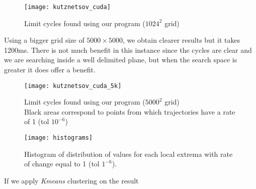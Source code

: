 \begin{figure}[H]
    \centering
    \texttt{[image: kutznetsov\_cuda]}
    \caption{Limit cycles found using our program ($1024^2$ grid)}%
    \label{fig:kuznetsov_cuda}
\end{figure}

Using a bigger grid size of $5000\times5000$, we obtain clearer results but it takes
1200ms. There is not much benefit in this instance since the cycles are clear and
we are searching inside a well delimited plane, but when the search space is greater
it does offer a benefit.

\begin{figure}[H]
    \centering
    \texttt{[image: kutznetsov\_cuda\_5k]}
    \caption{Limit cycles found using our program ($5000^2$ grid)\\
        Black areas correspond to points from which trajectories have
        a rate of 1 (tol $10^{-6}$)
    }%
    \label{fig:kuznetsov_cuda_5k}
\end{figure}

\begin{figure}[H]
    \centering
    \texttt{[image: histograms]}
    \caption{Histogram of distribution of values for each local extrema with rate of change
        equal to 1 (tol $1^{-6}$).
    }%
    \label{fig:histograms}
\end{figure}

If we apply \emph{Kmeans} clustering on the result
